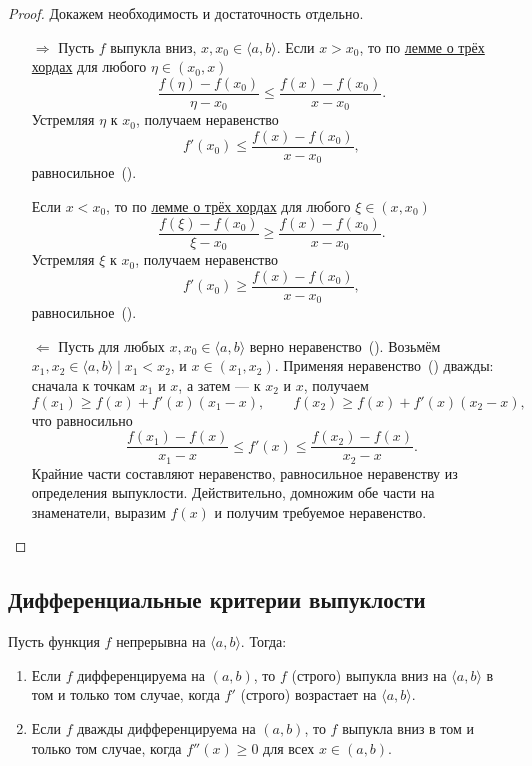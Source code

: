 \begin{proof}
	Докажем необходимость и достаточность отдельно.
	\begin{enumerate}
		\item[\(\Rightarrow\)] Пусть \(f\) выпукла вниз, \(x, x_0 \in \langle a, b \rangle\). Если \(x > x_0\), то по \hyperlink{trihordy}{лемме о трёх хордах} для любого \(\eta \in (x_0, x)\) \[
		\frac{f(\eta) - f(x_0)}{\eta - x_0} \leqslant \frac{f(x) - f(x_0)}{x - x_0}.
		\]
		Устремляя \(\eta\) к \(x_0\), получаем неравенство \[
		f'(x_0) \leqslant \frac{f(x) - f(x_0)}{x - x_0},
		\]
		равносильное~(\textasteriskcentered).
		
		Если \(x < x_0\), то по \hyperlink{trihordy}{лемме о трёх хордах} для любого \(\xi \in (x, x_0)\) \[
		\frac{f(\xi) - f(x_0)}{\xi - x_0} \geqslant \frac{f(x) - f(x_0)}{x - x_0}.
		\]
		Устремляя \(\xi\) к \(x_0\), получаем неравенство \[
		f'(x_0) \geqslant \frac{f(x) - f(x_0)}{x - x_0},
		\]
		равносильное~(\textasteriskcentered).
		\item[\(\Leftarrow\)] Пусть для любых \(x, x_0 \in \langle a, b \rangle\) верно неравенство~(\textasteriskcentered). Возьмём \(x_1, x_2 \in \langle a, b \rangle \mid x_1 < x_2\), и \(x \in (x_1, x_2)\). Применяя неравенство~(\textasteriskcentered) дважды: сначала к точкам \(x_1\) и \(x\), а затем --- к \(x_2\) и \(x\), получаем \[
		f(x_1) \geqslant f(x) + f'(x) (x_1 - x), \qquad f(x_2) \geqslant f(x) + f'(x) (x_2 - x),
		\]
		что равносильно \[
		\frac{f(x_1) - f(x)}{x_1 - x} \leqslant f'(x) \leqslant \frac{f(x_2) - f(x)}{x_2 - x}.
		\]
		Крайние части составляют неравенство, равносильное неравенству из определения выпуклости. Действительно, домножим обе части на знаменатели, выразим \(f(x)\) и получим требуемое неравенство.
	\end{enumerate}
\end{proof}

\subsection{Дифференциальные критерии выпуклости}

\begin{theorem}
	Пусть функция \(f\) непрерывна на \(\langle a, b \rangle\). Тогда:
	\begin{enumerate}
		\item Если \(f\) дифференцируема на \((a, b)\), то \(f\) (строго) выпукла вниз на \(\langle a, b \rangle\) в том и только том случае, когда \(f'\) (строго) возрастает на \(\langle a, b \rangle\).
		\item Если \(f\) дважды дифференцируема на \((a, b)\), то \(f\) выпукла вниз в том и только том случае, когда \(f''(x) \geqslant 0\) для всех \(x \in (a, b)\).
	\end{enumerate}
\end{theorem}

